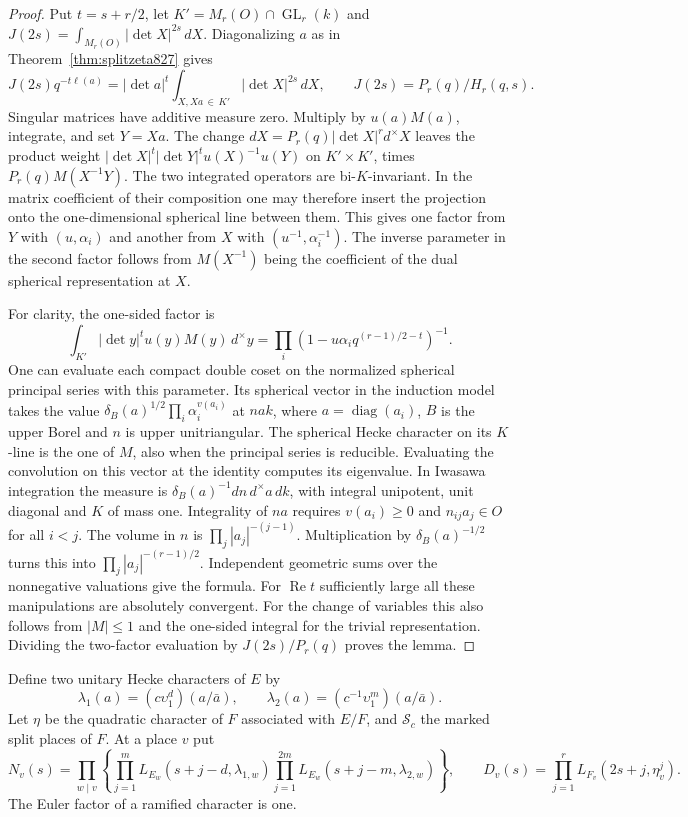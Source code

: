 \documentclass[a4paper,11pt]{article}
\theoremstyle{definition}
\theoremstyle{remark}
\numberwithin{equation}{section}
\begin{document}
\begin{proof}
Put \(t=s+r/2\), let \(K'=M_r(O)\cap\operatorname{GL}_r(k)\)
and \(J(2s)=\int_{M_r(O)}|\det X|^{2s}\,dX\). Diagonalizing
\(a\) as in Theorem~\ref{thm:splitzeta827} gives
\[
 J(2s)q^{-t\ell(a)}
   =|\det a|^t\int_{X,Xa\,\in\, K'}|\det X|^{2s}\,dX,
 \qquad J(2s)=P_r(q)/H_r(q,s).
\]
Singular matrices have additive measure zero. Multiply by
\(u(a)M(a)\), integrate, and set \(Y=Xa\). The change
\(dX=P_r(q)|\det X|^r d^\times X\) leaves the product
weight \(|\det X|^t|\det Y|^t u(X)^{-1}u(Y)\) on \(K'\times K'\),
times \(P_r(q)M(X^{-1}Y)\). The two integrated operators
are bi-\(K\)-invariant. In the matrix coefficient of their
composition one may therefore insert the projection onto
the one-dimensional spherical line between them. This gives
one factor from \(Y\) with \((u,\alpha_i)\) and another from
\(X\) with \((u^{-1},\alpha_i^{-1})\). The inverse parameter
in the second factor follows from \(M(X^{-1})\) being the
coefficient of the dual spherical representation at \(X\).

For clarity, the one-sided factor is
\[
 \int_{K'}|\det y|^t u(y)M(y)\,d^\times y
       =\prod_i(1-u\alpha_i q^{(r-1)/2-t})^{-1}.
\]
One can evaluate each compact double coset on the normalized
spherical principal series with this parameter. Its spherical
vector in the induction model takes the value
\(\delta_B(a)^{1/2}\prod_i\alpha_i^{v(a_i)}\) at \(nak\),
where \(a=\operatorname{diag}(a_i)\), \(B\) is the upper Borel
and \(n\) is upper unitriangular. The spherical Hecke character
on its \(K\)-line is the one of \(M\), also when the principal
series is reducible. Evaluating the convolution on this vector
at the identity computes its eigenvalue. In Iwasawa integration
the measure is \(\delta_B(a)^{-1}dn\,d^\times a\,dk\), with
integral unipotent, unit diagonal and \(K\) of mass one.
Integrality of \(na\) requires \(v(a_i)\ge0\) and
\(n_{ij}a_j\in O\) for all \(i<j\). The volume in \(n\) is
\(\prod_j|a_j|^{-(j-1)}\). Multiplication by
\(\delta_B(a)^{-1/2}\) turns this into
\(\prod_j|a_j|^{-(r-1)/2}\). Independent geometric sums over
the nonnegative valuations give the formula. For
\(\operatorname{Re}t\) sufficiently large all these manipulations
are absolutely convergent. For the change of variables this
also follows from \(|M|\le1\) and the one-sided integral for
the trivial representation. Dividing the two-factor evaluation
by \(J(2s)/P_r(q)\) proves the lemma.
\end{proof}

Define two unitary Hecke characters of \(E\) by
\[
 \lambda_1(a)=(c\upsilon_1^d)(a/\bar a),\qquad
 \lambda_2(a)=(c^{-1}\upsilon_1^m)(a/\bar a).
\]
Let \(\eta\) be the quadratic character of \(F\) associated
with \(E/F\), and \(\mathcal S_c\) the marked split places of
\(F\). At a place \(v\) put
\[
 N_v(s)=
 \prod_{w\mid v}\left\{
 \prod_{j=1}^m L_{E_w}(s+j-d,\lambda_{1,w})
 \prod_{j=1}^{2m} L_{E_w}(s+j-m,\lambda_{2,w})\right\},\qquad
 D_v(s)=\prod_{j=1}^r L_{F_v}(2s+j,\eta_v^j).
\]
The Euler factor of a ramified character is one.
\end{document}
